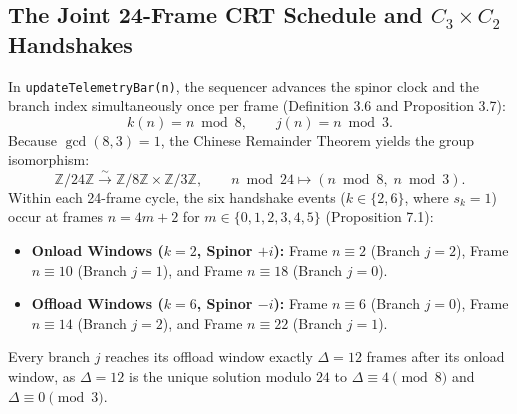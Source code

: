 \documentclass[11pt, a4paper]{article}
\begin{document}
\subsection{The Joint 24-Frame CRT Schedule and \texorpdfstring{$C_3 \times C_2$}{C3 x C2} Handshakes}
In \texttt{updateTelemetryBar(n)}, the sequencer advances the spinor clock and the branch index simultaneously once per frame (Definition 3.6 and Proposition 3.7):
\begin{equation}
k(n) = n \bmod 8, \qquad j(n) = n \bmod 3.
\end{equation}
Because $\gcd(8, 3) = 1$, the Chinese Remainder Theorem yields the group isomorphism:
\begin{equation}
\mathbb{Z}/24\mathbb{Z} \xrightarrow{\sim} \mathbb{Z}/8\mathbb{Z} \times \mathbb{Z}/3\mathbb{Z}, \qquad n \bmod 24 \mapsto (n \bmod 8,\; n \bmod 3).
\end{equation}
Within each 24-frame cycle, the six handshake events ($k \in \{2, 6\}$, where $s_k = 1$) occur at frames $n = 4m + 2$ for $m \in \{0, 1, 2, 3, 4, 5\}$ (Proposition 7.1):
\begin{itemize}
    \item \textbf{Onload Windows ($k = 2$, Spinor $+i$):} Frame $n \equiv 2$ (Branch $j=2$), Frame $n \equiv 10$ (Branch $j=1$), and Frame $n \equiv 18$ (Branch $j=0$).
    \item \textbf{Offload Windows ($k = 6$, Spinor $-i$):} Frame $n \equiv 6$ (Branch $j=0$), Frame $n \equiv 14$ (Branch $j=2$), and Frame $n \equiv 22$ (Branch $j=1$).
\end{itemize}
Every branch $j$ reaches its offload window exactly $\Delta = 12$ frames after its onload window, as $\Delta = 12$ is the unique solution modulo $24$ to $\Delta \equiv 4 \pmod 8$ and $\Delta \equiv 0 \pmod 3$.
\end{document}
